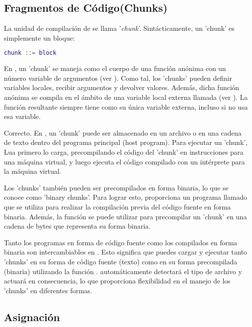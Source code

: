 \subsection{Fragmentos de Código(Chunks)}
La unidad de compilación de  se llama '\textit{chunk}'. Sintácticamente, un 'chunk' es simplemente un bloque:

\begin{lstlisting}[language=Lua]
    chunk ::= block
\end{lstlisting}

En , un 'chunk' se maneja como el cuerpo de una función anónima con un número variable de argumentos (ver ). Como tal, los 'chunks' pueden definir variables locales, recibir argumentos y devolver valores. Además, dicha función anónima se compila en el ámbito de una variable local externa llamada  (ver ). La función resultante siempre tiene  como su única variable externa, incluso si no usa esa variable.

Correcto. En , un 'chunk' puede ser almacenado en un archivo o en una cadena de texto dentro del programa principal (host program). Para ejecutar un 'chunk', Lua primero lo carga, precompilando el código del 'chunk' en instrucciones para una máquina virtual, y luego ejecuta el código compilado con un intérprete para la máquina virtual.

Los 'chunks' también pueden ser precompilados en forma binaria, lo que se conoce como 'binary chunks'. Para lograr esto,  proporciona un programa llamado  que se utiliza para realizar la compilación previa del código fuente en forma binaria. Además, la función  se puede utilizar para precompilar un 'chunk' en una cadena de bytes que representa su forma binaria.

Tanto los programas en forma de código fuente como los compilados en forma binaria son intercambiables en . Esto significa que puedes cargar y ejecutar tanto 'chunks' en su forma de código fuente (texto) como en su forma precompilada (binaria) utilizando la función .  automáticamente detectará el tipo de archivo y actuará en consecuencia, lo que proporciona flexibilidad en el manejo de los 'chunks' en diferentes formas.


\subsection{Asignación}
\lipsum[1]

